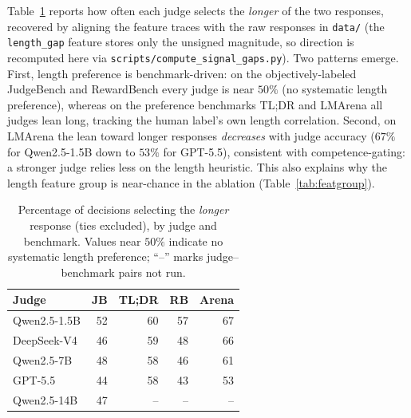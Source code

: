 Table~\ref{tab:lengthbias} reports how often each judge selects the \emph{longer} of the two responses, recovered by aligning the feature traces with the raw responses in \texttt{data/} (the \texttt{length\_gap} feature stores only the unsigned magnitude, so direction is recomputed here via \texttt{scripts/compute\_signal\_gaps.py}). Two patterns emerge. First, length preference is benchmark-driven: on the objectively-labeled JudgeBench and RewardBench every judge is near $50\%$ (no systematic length preference), whereas on the preference benchmarks TL;DR and LMArena all judges lean long, tracking the human label's own length correlation. Second, on LMArena the lean toward longer responses \emph{decreases} with judge accuracy ($67\%$ for Qwen2.5-1.5B down to $53\%$ for GPT-5.5), consistent with competence-gating: a stronger judge relies less on the length heuristic. This also explains why the length feature group is near-chance in the ablation (Table~\ref{tab:featgroup}).

\begin{table}[t]
\centering
\small
\setlength{\tabcolsep}{5pt}
\caption{Percentage of decisions selecting the \emph{longer} response (ties excluded), by judge and benchmark. Values near $50\%$ indicate no systematic length preference; ``--'' marks judge--benchmark pairs not run.}
\label{tab:lengthbias}
\begin{tabular}{lrrrr}
\toprule
Judge & JB & TL;DR & RB & Arena \\
\midrule
Qwen2.5-1.5B & 52 & 60 & 57 & 67 \\
DeepSeek-V4 & 46 & 59 & 48 & 66 \\
Qwen2.5-7B & 48 & 58 & 46 & 61 \\
GPT-5.5 & 44 & 58 & 43 & 53 \\
Qwen2.5-14B & 47 & -- & -- & -- \\
\bottomrule
\end{tabular}
\end{table}
